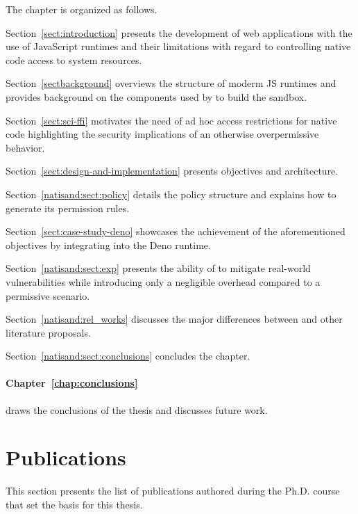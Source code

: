 \smallskip
\noindent The chapter is organized as follows.
\begin{compactitem}
    \item Section~\ref{sect:introduction} presents the development of
     web applications with the use of JavaScript runtimes and their
     limitations with regard to controlling native code access to
     system resources.
    \item Section~\ref{sectbackground} overviews the structure of
     moderm JS runtimes and provides background on the components
     used by \natisand to build the sandbox. 
    \item Section~\ref{sect:sci-ffi} motivates the need of
     ad hoc access restrictions for native code highlighting the
     security implications of an otherwise overpermissive behavior.
    \item Section~\ref{sect:design-and-implementation} presents
     \natisand objectives and architecture.
    \item Section~\ref{natisand:sect:policy} details the policy
     structure and explains how to generate its permission rules.
    \item Section~\ref{sect:case-study-deno} showcases the achievement
     of the aforementioned objectives by integrating \natisand into
     the Deno runtime. 
    \item Section~\ref{natisand:sect:exp} presents the ability of
     \natisand to mitigate real-world vulnerabilities while
     introducing only a negligible overhead compared to a permissive
     scenario.
    \item Section~\ref{natisand:rel_works} discusses the major
     differences between \natisand and other literature proposals.
    \item Section~\ref{natisand:sect:conclusions} concludes the chapter.
\end{compactitem}
\medskip

\paragraph*{Chapter~\ref{chap:conclusions}} draws the conclusions of
the thesis and discusses future work.

\section{Publications}

This section presents the list of publications authored during the
Ph.D. course that set the basis for this thesis.

